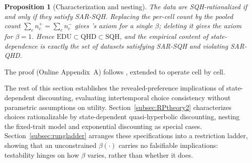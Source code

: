 \documentclass[11pt,a4paper]{article}
\theoremstyle{plain}
\newtheorem{proposition}{Proposition}
\theoremstyle{definition}
\begin{document}


\begin{proposition}[Characterization and nesting]
\label{prop:sqh}
The data are SQH-rationalized if and only if they satisfy SAR-SQH. Replacing the per-cell
count by the pooled count $\sum_c n^+_c=\sum_c n^-_c$ gives \citeauthor{eis2020}'s axiom
for a single $\beta$; deleting it gives the axiom for $\beta=1$. Hence
$\text{EDU}\subset\text{QHD}\subset\text{SQH}$, and the empirical content of
state-dependence is exactly the set of datasets satisfying SAR-SQH and violating SAR-QHD.
\end{proposition}

\noindent
The proof (Online Appendix~A) follows \citet{eis2020}, extended to operate cell by cell.
\fi


\noindent
The rest of this section establishes the revealed-preference implications of state-dependent discounting, evaluating intertemporal choice consistency without parametric assumptions on utility.
Section~\ref{subsec:RPtheory2} characterizes choices rationalizable by state-dependent quasi-hyperbolic discounting, nesting the fixed-trait model and exponential discounting as special cases. 
Section~\ref{subsec:rungladder} arranges these specifications into a restriction ladder, showing that an unconstrained $\beta(\cdot)$ carries no falsifiable implications: testability hinges on how $\beta$ varies, rather than whether it does.


\clearpage
\end{document}
